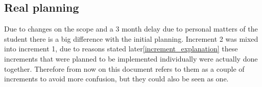 %
%
%
%






\subsection{Real planning}
Due to changes on the scope and a 3 month delay due to personal matters of the student there is a big difference with the initial planning.
\linej
\linej
Increment 2 was mixed into increment 1, due to reasons stated later\ref{increment_explanation} these increments that were planned to be implemented individually were actually done together.
Therefore from now on this document refers to them as a couple of increments to avoid more confusion, but they could also be seen as one.

\newcommand{\PStart}{2018-11-01}
\newcommand{\FBeginning}{2018-11-07}
\newcommand{\SIncrementoUnoInicial}{2018-11-08}
\newcommand{\FIncrementoUnoInicial}{2018-12-05}
\newcommand{\SPause}{2018-12-06}
\newcommand{\FPause}{2019-02-24}
\newcommand{\SComeback}{2019-02-25}
\newcommand{\FComeback}{2019-02-28}
\newcommand{\SIncrementoUnoContinuation}{2019-03-01}
\newcommand{\FIncrementoUnoContinuation}{2019-05-04}
\newcommand{\SPauseDos}{2019-05-05}
\newcommand{\FPauseDos}{2019-05-19}
\newcommand{\SIncrementoUnoFinal}{2019-05-20}
\newcommand{\FIncrementoUnoFinal}{2019-06-14}
\newcommand{\SIncrementoTres}{2019-06-15}
\newcommand{\FIncrementoTres}{2019-07-17}
\newcommand{\SClosing}{2019-07-18}
\newcommand{\PClosing}{2019-07-25}


